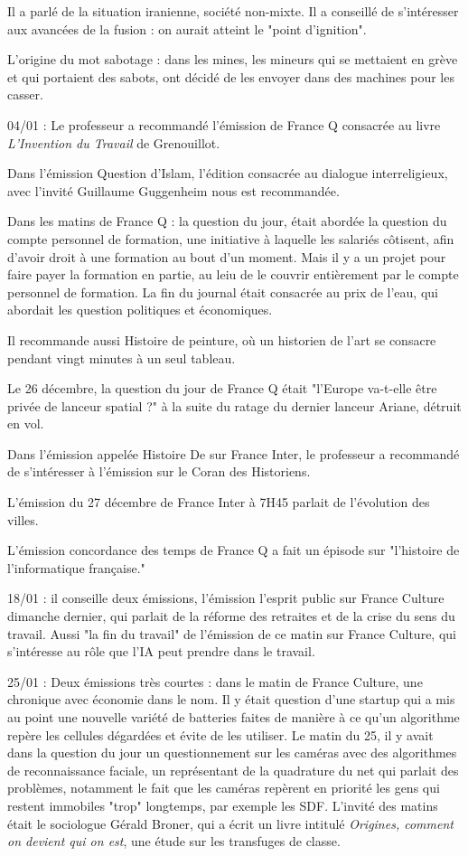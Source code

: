 \documentclass[a4paper,12pt]{book}
\begin{document}
\par Il a parlé de la situation iranienne, société non-mixte. Il a conseillé de s'intéresser aux avancées de la fusion : on aurait atteint le "point d'ignition".
\par L'origine du mot sabotage : dans les mines, les mineurs qui se mettaient en grève et qui portaient des sabots, ont décidé de les envoyer dans des machines pour les casser.
\par 04/01 : Le professeur a recommandé l'émission de France Q consacrée au livre \textit{L'Invention du Travail} de Grenouillot.
\par Dans l'émission Question d'Islam, l'édition consacrée au dialogue interreligieux, avec l'invité Guillaume Guggenheim nous est recommandée.
\par Dans les matins de France Q : la question du jour, était abordée la question du compte personnel de formation, une initiative à laquelle les salariés côtisent, afin d'avoir droit à une formation au bout d'un moment. Mais il y a un projet pour faire payer la formation en partie, au leiu de le couvrir entièrement par le compte personnel de formation. La fin du journal était consacrée au prix de l'eau, qui abordait les question politiques et économiques.
\par Il recommande aussi Histoire de peinture, où un historien de l'art se consacre pendant vingt minutes à un seul tableau.
\par Le 26 décembre, la question du jour de France Q était "l'Europe va-t-elle être privée de lanceur spatial ?" à la suite du ratage du dernier lanceur Ariane, détruit en vol.
\par Dans l'émission appelée Histoire De sur France Inter, le professeur a recommandé de s'intéresser à l'émission sur le Coran des Historiens.
\par L'émission du 27 décembre de France Inter à 7H45 parlait de l'évolution des villes.
\par L'émission concordance des temps de France Q a fait un épisode sur "l'histoire de l'informatique française."
\par 18/01 : il conseille deux émissions, l'émission l'esprit public sur France Culture dimanche dernier, qui parlait de la réforme des retraites et de la crise du sens du travail. Aussi "la fin du travail" de l'émission de ce matin sur France Culture, qui s'intéresse au rôle que l'IA peut prendre dans le travail.
\par 25/01 : Deux émissions très courtes : dans le matin de France Culture, une chronique avec économie dans le nom. Il y était question d'une startup qui a mis au point une nouvelle variété de batteries faites de manière à ce qu'un algorithme repère les cellules dégardées et évite de les utiliser. Le matin du 25, il y avait dans la question du jour un questionnement sur les caméras avec des algorithmes de reconnaissance faciale, un représentant de la quadrature du net qui parlait des problèmes, notamment le fait que les caméras repèrent en priorité les gens qui restent immobiles "trop" longtemps, par exemple les SDF. L'invité des matins était le sociologue Gérald Broner, qui a écrit un livre intitulé \textit{Origines, comment on devient qui on est}, une étude sur les transfuges de classe.
\end{document}
